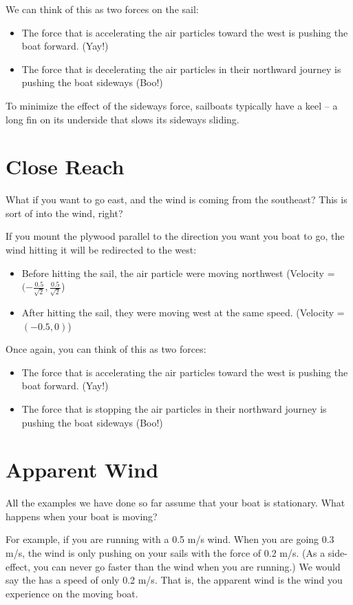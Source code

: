 We can think of this as two forces on the sail: 
\begin{itemize}
\item The force that is accelerating the air particles toward the west is pushing the boat forward.  (Yay!)
\item The force that is decelerating the air particles in their northward journey is pushing the boat sideways (Boo!)
\end{itemize}

To minimize the effect of the sideways force,  sailboats typically have  a keel -- a long fin on its underside that slows its sideways sliding.

\section{Close Reach}

What if you want to go east,  and the wind is coming from the southeast?  This is sort of into the wind,  right?

If you mount the plywood parallel to the direction you want you boat to go,  the wind hitting it will be redirected to the west:

\begin{itemize}
\item Before hitting the sail,  the air particle were moving northwest (Velocity = $(-\frac{0.5}{\sqrt{2}}, \frac{0.5}{\sqrt{2}}$)
\item After hitting the sail,  they were moving west at the same speed.  (Velocity = $(-0.5,0)$)
\end{itemize}

Once again, you can think of this as two forces: 
\begin{itemize}
\item The force that is accelerating the air particles toward the west is pushing the boat forward.  (Yay!)
\item The force that is stopping the air particles in their northward journey is pushing the boat sideways (Boo!)
\end{itemize}

\section{Apparent Wind}

All the examples we have done so far assume that your boat is stationary.   What happens when your boat is moving?

For example,  if you are running with a 0.5 m/s wind.  When you are going 0.3 m/s,  the wind is only pushing on your sails with the force of 0.2 m/s.  
(As a side-effect, you can never go faster than the wind when you are running.)  We would say the  has a speed of only 0.2 m/s.  
That is, the apparent wind is the wind you experience on the moving boat.

